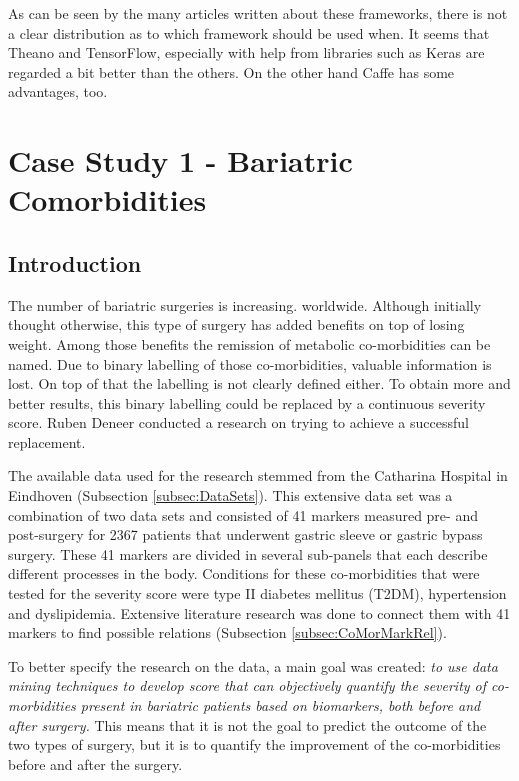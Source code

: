 \documentclass[10pt,a4paper]{report}
\begin{document}
	As can be seen by the many articles written about these frameworks, there 
	is not a clear distribution as to which framework should be used when. It 
	seems that Theano and TensorFlow, especially with help from libraries such 
	as Keras are regarded a bit better than the others. On the other hand Caffe 
	has some advantages, too.
	
	
	
	
	\chapter{Case Study 1 - Bariatric Comorbidities}
	\label{app:CS1}
	
	\section{Introduction}
	\label{sec:Intro}
	
	The number of bariatric surgeries is increasing. worldwide. Although initially thought otherwise, this type of surgery has added benefits on top of losing weight. Among those benefits the remission of metabolic co-morbidities can be named. Due to binary labelling of those co-morbidities, valuable information is lost. On top of that the labelling is not clearly defined either. To obtain more and better results, this binary labelling could be replaced by a continuous severity score. Ruben Deneer conducted a research on trying to achieve a successful replacement.
	
	The available data used for the research stemmed from the Catharina Hospital in Eindhoven (Subsection \ref{subsec:DataSets}). This extensive data set was a combination of two data sets and consisted of 41 markers measured pre- and post-surgery for 2367 patients that underwent gastric sleeve or gastric bypass surgery. These 41 markers are divided in several sub-panels that each describe different processes in the body. Conditions for these co-morbidities that were tested for the severity score were type II diabetes mellitus (T2DM), hypertension and dyslipidemia. Extensive literature research was done to connect them with 41 markers to find possible relations (Subsection \ref{subsec:CoMorMarkRel}).
	
	To better specify the research on the data, a main goal was created: \emph{to use data mining techniques to develop score that can objectively quantify the severity of co-morbidities present in bariatric patients based on biomarkers, both before and after surgery.}\cite{Deneer2017Thesis} This means that it is not the goal to predict the outcome of the two types of surgery, but it is to quantify the improvement of the co-morbidities before and after the surgery.
	
\end{document}
